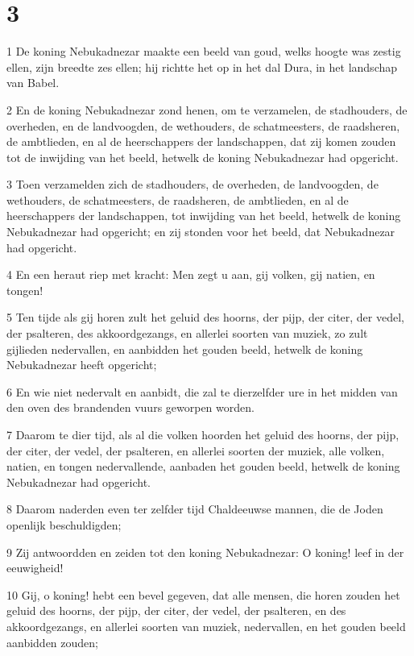 \chapter{3}

\par 1 De koning Nebukadnezar maakte een beeld van goud, welks hoogte was zestig ellen, zijn breedte zes ellen; hij richtte het op in het dal Dura, in het landschap van Babel.
\par 2 En de koning Nebukadnezar zond henen, om te verzamelen, de stadhouders, de overheden, en de landvoogden, de wethouders, de schatmeesters, de raadsheren, de ambtlieden, en al de heerschappers der landschappen, dat zij komen zouden tot de inwijding van het beeld, hetwelk de koning Nebukadnezar had opgericht.
\par 3 Toen verzamelden zich de stadhouders, de overheden, de landvoogden, de wethouders, de schatmeesters, de raadsheren, de ambtlieden, en al de heerschappers der landschappen, tot inwijding van het beeld, hetwelk de koning Nebukadnezar had opgericht; en zij stonden voor het beeld, dat Nebukadnezar had opgericht.
\par 4 En een heraut riep met kracht: Men zegt u aan, gij volken, gij natien, en tongen!
\par 5 Ten tijde als gij horen zult het geluid des hoorns, der pijp, der citer, der vedel, der psalteren, des akkoordgezangs, en allerlei soorten van muziek, zo zult gijlieden nedervallen, en aanbidden het gouden beeld, hetwelk de koning Nebukadnezar heeft opgericht;
\par 6 En wie niet nedervalt en aanbidt, die zal te dierzelfder ure in het midden van den oven des brandenden vuurs geworpen worden.
\par 7 Daarom te dier tijd, als al die volken hoorden het geluid des hoorns, der pijp, der citer, der vedel, der psalteren, en allerlei soorten der muziek, alle volken, natien, en tongen nedervallende, aanbaden het gouden beeld, hetwelk de koning Nebukadnezar had opgericht.
\par 8 Daarom naderden even ter zelfder tijd Chaldeeuwse mannen, die de Joden openlijk beschuldigden;
\par 9 Zij antwoordden en zeiden tot den koning Nebukadnezar: O koning! leef in der eeuwigheid!
\par 10 Gij, o koning! hebt een bevel gegeven, dat alle mensen, die horen zouden het geluid des hoorns, der pijp, der citer, der vedel, der psalteren, en des akkoordgezangs, en allerlei soorten van muziek, nedervallen, en het gouden beeld aanbidden zouden;
